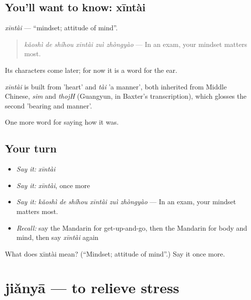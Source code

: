 \subsection*{You'll want to know: xīntài}
\emph{xīntài} — \textquotedblleft{}mindset; attitude of mind\textquotedblright{}.

\begin{quote}
\emph{kǎoshì de shíhou xīntài zuì zhòngyào} — In an exam, your mindset matters most.
\end{quote}

Its characters come later; for now it is a word for the ear.

\begin{cousinweb}
\emph{xīntài} is built from  'heart' and \emph{tài} 'a manner', both inherited from Middle Chinese, \emph{sim} and \emph{thojH} (Guangyun, in Baxter's transcription), which glosses the second 'bearing and manner'.
\end{cousinweb}

\begin{grammarlens}[title={What you've built}]
One more word for saying how it was.
\end{grammarlens}

\subsection*{Your turn}
\begin{itemize}
\raggedright
  \item \emph{Say it:} \emph{xīntài}
  \item \emph{Say it:} \emph{xīntài}, once more
  \item \emph{Say it:} \emph{kǎoshì de shíhou xīntài zuì zhòngyào} — In an exam, your mindset matters most.
  \item \emph{Recall:} say the Mandarin for get-up-and-go, then the Mandarin for body and mind, then say \emph{xīntài} again
\end{itemize}

\begin{tcolorbox}[breakable,colback=teal!4,colframe=teal!35!black,title={Before you move on}]
What does xīntài mean? (\textquotedblleft{}Mindset; attitude of mind\textquotedblright{}.) Say it once more.
\end{tcolorbox}
\section[jiǎnyā]{jiǎnyā — to relieve stress}

